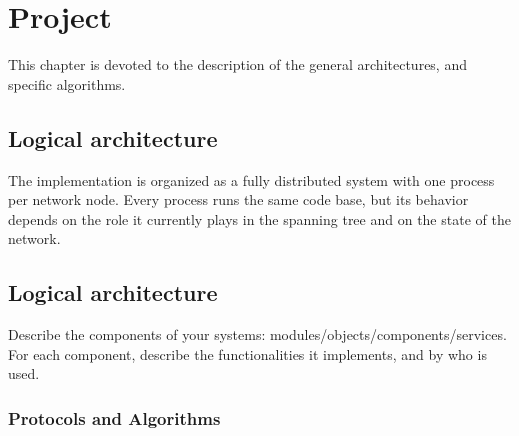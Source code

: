 \documentclass{memoir}
\begin{document}








\chapter{Project}

This chapter is devoted to the description of the general architectures, and specific algorithms.

\section{Logical architecture}

The implementation is organized as a fully distributed system with one process per network node. Every process runs the same code base, but its behavior depends on the role it currently plays in the spanning tree and on the state of the network.

\section{Logical architecture}
Describe the components of your systems: modules/objects/components/services.
For each component, describe the functionalities it implements, and by who is used.

\subsection{Protocols and Algorithms}
\end{document}
